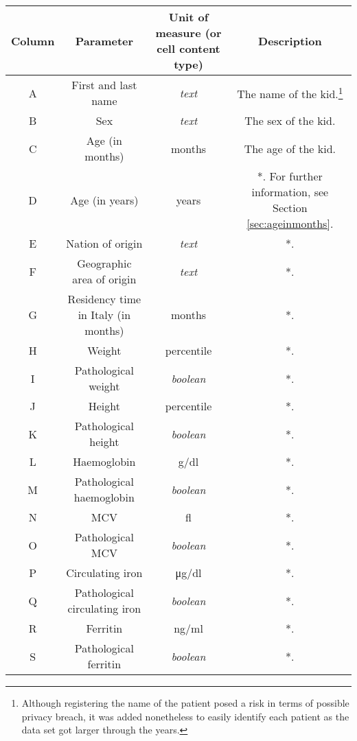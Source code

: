 \begin{table}[ht!]
	\centering 
	\def\arraystretch{1.5}
	\begin{tabularx}{\textwidth}{|C|C|C|C|}
		\hline
		\textbf{Column} & \textbf{Parameter} & \textbf{Unit of measure (or cell content type)} & \textbf{Description} \\
		\hline \hline
		A & First and last name & \textit{text} & The name of the kid.\footnote{Although registering the name of the patient posed a risk in terms of possible privacy breach, it was added nonetheless to easily identify each patient as the data set got larger through the years.}\\
		\hline
		B & Sex & \textit{text} & The sex of the kid.\\
		\hline
		C & Age (in months) & months & The age of the kid.  \\
		\hline
		D & Age (in years) & years & *. For further information, see Section \ref{sec:ageinmonths}. \\
		\hline
		E & Nation of origin & \textit{text} & *. \\
		\hline
		F & Geographic area of origin & \textit{text} & *. \\
		\hline
		G & Residency time in Italy (in months) & months & *. \\
		\hline
		H & Weight & percentile & *. \\
		\hline
		I & Pathological weight & \textit{boolean} & *. \\
		\hline
		J & Height & percentile & *. \\
		\hline
		K & Pathological height & \textit{boolean} & *. \\
		\hline
		L & Haemoglobin & \si{\gram}/\si{\deci\litre} & *. \\
		\hline
		M & Pathological haemoglobin & \textit{boolean} & *. \\
		\hline
		N & MCV & \si{\femto\litre} & *. \\
		\hline
		O & Pathological MCV & \textit{boolean} & *. \\
		\hline
		P & Circulating iron & \si{\micro\gram}/\si{\deci\litre} & *. \\
		\hline
		Q & Pathological circulating iron & \textit{boolean} & *. \\
		\hline
		R & Ferritin & \si{\nano\gram}/\si{\milli\litre} & *. \\
		\hline
		S & Pathological ferritin & \textit{boolean} & *. \\
		\hline
	\end{tabularx}
	\label{tab:columnparameter2}
\end{table}


